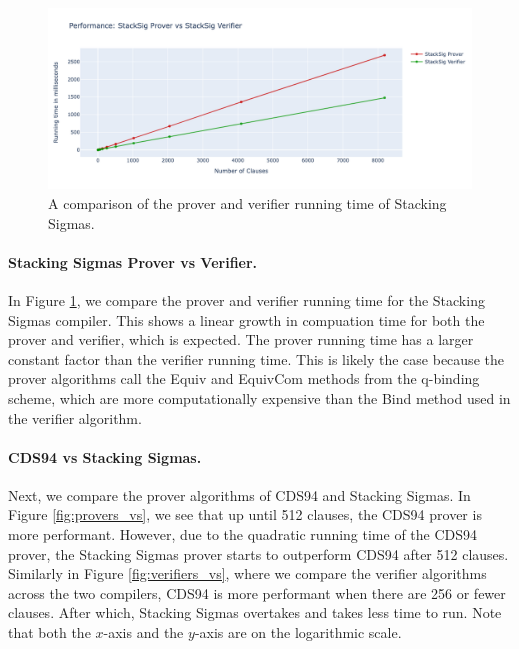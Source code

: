 \begin{figure}[H]
  \centering
  \includegraphics[width=\linewidth]{../assets/plots/ss_vs.png}
  \caption{A comparison of the prover and verifier running time of Stacking Sigmas.}
  \label{fig:stacksig_vs}
\end{figure}

\paragraph{Stacking Sigmas Prover vs Verifier.} In Figure \ref{fig:stacksig_vs}, we compare the prover and verifier running time
for the Stacking Sigmas compiler. This shows a linear growth in compuation time 
for both the prover and verifier, which is expected. The prover running time has 
a larger constant factor than the verifier running time. This is likely the case 
because the prover algorithms call the \textsf{Equiv} and \textsf{EquivCom} 
methods from the q-binding scheme, which are more computationally expensive than
the \textsf{Bind} method used in the verifier algorithm.

\paragraph{CDS94 vs Stacking Sigmas.} Next, we compare the prover algorithms of CDS94 and Stacking Sigmas. In Figure 
\ref{fig:provers_vs}, we see that up until 512 clauses, the CDS94 prover is more 
performant. However, due to the quadratic running time of the CDS94 prover, the 
Stacking Sigmas prover starts to outperform CDS94 after 512 clauses. 
Similarly in Figure \ref{fig:verifiers_vs}, where we compare the verifier algorithms 
across the two compilers, CDS94 is more performant when there are 256 or fewer clauses. 
 After which, Stacking Sigmas overtakes and takes less time to run. Note that both the 
$x$-axis and the $y$-axis are on the logarithmic scale. 

